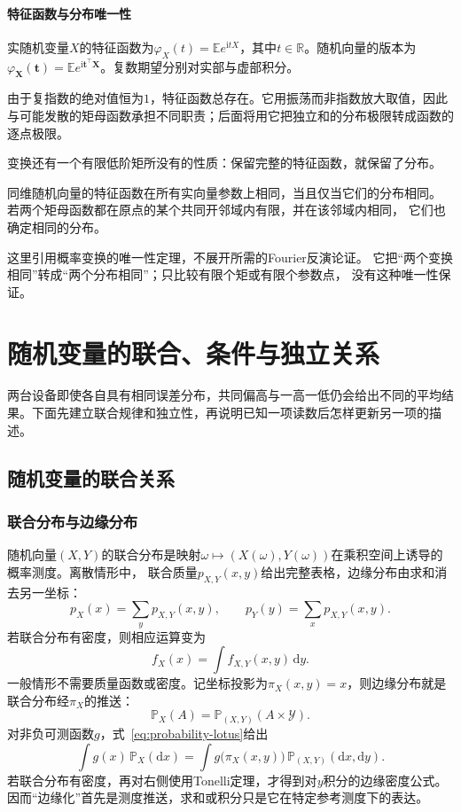 \paragraph{特征函数与分布唯一性}
\begin{definition}[特征函数]
  \label{def:probability-characteristic-function}
实随机变量\(X\)的特征函数为\(\varphi_X(t)=\mathbb E e^{\mathrm i tX}\)，其中\(t\in\mathbb R\)。随机向量的版本为\(\varphi_{\bm X}(\bm t)=\mathbb E e^{\mathrm i\bm t^\top\bm X}\)。复数期望分别对实部与虚部积分。
\end{definition}
由于复指数的绝对值恒为\(1\)，特征函数总存在。它用振荡而非指数放大取值，因此与可能发散的矩母函数承担不同职责；后面将用它把独立和的分布极限转成函数的逐点极限。

变换还有一个有限低阶矩所没有的性质：保留完整的特征函数，就保留了分布。
\begin{theorem}[变换函数的分布唯一性]
\label{thm:rv-transform-uniqueness}
同维随机向量的特征函数在所有实向量参数上相同，当且仅当它们的分布相同。
若两个矩母函数都在原点的某个共同开邻域内有限，并在该邻域内相同，
它们也确定相同的分布。
\end{theorem}
这里引用概率变换的唯一性定理，不展开所需的Fourier反演论证。
它把“两个变换相同”转成“两个分布相同”；只比较有限个矩或有限个参数点，
没有这种唯一性保证。

\section{随机变量的联合、条件与独立关系}
\label{sec:rv-relations}
两台设备即使各自具有相同误差分布，共同偏高与一高一低仍会给出不同的平均结果。下面先建立联合规律和独立性，再说明已知一项读数后怎样更新另一项的描述。

\subsection{随机变量的联合关系}
\label{sec:rv-joint}
\label{sec:probability-joint-marginal-conditional}
\subsubsection{联合分布与边缘分布}
随机向量\((X,Y)\)的联合分布是映射\(\omega\mapsto(X(\omega),Y(\omega))\)在乘积空间上诱导的概率测度。离散情形中，
联合质量\(p_{X,Y}(x,y)\)给出完整表格，边缘分布由求和消去另一坐标：
\[ p_X(x)=\sum_y p_{X,Y}(x,y),
  \qquad p_Y(y)=\sum_x p_{X,Y}(x,y). \]
若联合分布有密度，则相应运算变为
\[ f_X(x)=\int f_{X,Y}(x,y)\,\mathrm{d}y. \]
一般情形不需要质量函数或密度。记坐标投影为\(\pi_X(x,y)=x\)，则边缘分布就是联合分布经\(\pi_X\)的推送：
\[
  \mathbb{P}_X(A)
  =\mathbb{P}_{(X,Y)}(A\times\mathcal{Y}).
\]
对非负可测函数\(g\)，式~\eqref{eq:probability-lotus}给出
\[
  \int g(x)\,\mathbb{P}_X(\mathrm{d}x)
  =
  \int g\bigl(\pi_X(x,y)\bigr)\,
       \mathbb{P}_{(X,Y)}(\mathrm{d}x,\mathrm{d}y).
\]
若联合分布有密度，再对右侧使用Tonelli定理，才得到对\(y\)积分的边缘密度公式。因而“边缘化”首先是测度推送，求和或积分只是它在特定参考测度下的表达。

